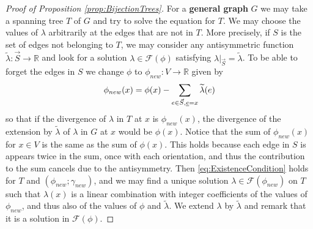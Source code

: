 \documentclass[11pt,a4paper]{amsart}
\numberwithin{equation}{section}
\theoremstyle{definition}
\begin{document}
\begin{proof}[Proof of Proposition
\ref{prop:BijectionTrees}]
	For a \textbf{general graph} $G$ we
	may take a spanning tree $T$ of $G$
	and try to solve
	the equation for $T$. 
	We may choose
	the values of $\lambda$
	arbitrarily
	at the edges that are not in $T$. More precisely,
	if $S$ is the set of edges not belonging to $T$,
	we may consider any antisymmetric function
	$\widetilde \lambda: \vec S \to \mathbb R $
	and look for a solution
	$\lambda \in \mathcal F(\phi)$
	satisfying $\lambda|_{\vec S} = \widetilde \lambda$.
	To 
	be able to forget the edges in $S$ we change $\phi$ to
	$\phi_{new}:V \to \mathbb R$ given by
		\[\phi_{\tiny new}(x) =\phi(x) -
	\sum_{e \in \vec S, \underline{e} = x}
	\widetilde \lambda(e)\]
	so that if the divergence of $\lambda$
	in $T$ at $x$ is
	$\phi_{new}(x)$, the divergence of the extension
	by $\widetilde \lambda$
	of $\lambda$
	in $G$ at $x$ would be 
	$\phi(x)$.
	Notice that the sum of $\phi_{new}(x)$
	for $x \in V$ is the same as the sum of 
	$\phi(x)$.
	This holds because each edge in $S$ is appears twice in the sum,
	once with each orientation, and thus the contribution to the sum cancels due to the antisymmetry.
	Then 
	\eqref{eq:ExistenceCondition} holds
	for $T$ and $(\phi_{new};\gamma_{new})$, and we may
	find a unique solution $\lambda \in \mathcal F(\phi_{new})$ on $T$ such that $\lambda(x)$ is a linear combination with integer coefficients of the values of $\phi_{new}$, and thus also of the values of $\phi$ and $\tilde{\lambda}$.	We extend $\lambda$ by $\widetilde 
	\lambda$ and remark that it is a solution in
	$\mathcal F(\phi)$. 
	

\end{proof}
\end{document}
